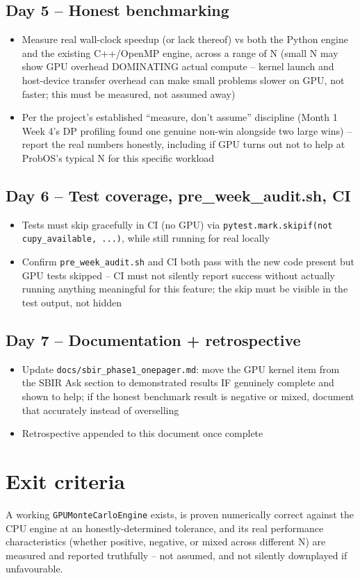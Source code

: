 \documentclass[11pt]{article}
\begin{document}
\subsection*{Day 5 -- Honest benchmarking}
\begin{itemize}[leftmargin=*]
  \item Measure real wall-clock speedup (or lack thereof) vs both the
    Python engine and the existing C++/OpenMP engine, across a range
    of N (small N may show GPU overhead DOMINATING actual compute --
    kernel launch and host-device transfer overhead can make small
    problems slower on GPU, not faster; this must be measured, not
    assumed away)
  \item Per the project's established ``measure, don't assume''
    discipline (Month 1 Week 4's DP profiling found one genuine
    non-win alongside two large wins) -- report the real numbers
    honestly, including if GPU turns out not to help at ProbOS's
    typical N for this specific workload
\end{itemize}

\subsection*{Day 6 -- Test coverage, pre\_week\_audit.sh, CI}
\begin{itemize}[leftmargin=*]
  \item Tests must skip gracefully in CI (no GPU) via
    \texttt{pytest.mark.skipif(not cupy\_available, ...)}, while still
    running for real locally
  \item Confirm \texttt{pre\_week\_audit.sh} and CI both pass with the
    new code present but GPU tests skipped -- CI must not silently
    report success without actually running anything meaningful for
    this feature; the skip must be visible in the test output, not
    hidden
\end{itemize}

\subsection*{Day 7 -- Documentation + retrospective}
\begin{itemize}[leftmargin=*]
  \item Update \texttt{docs/sbir\_phase1\_onepager.md}: move the GPU
    kernel item from the SBIR Ask section to demonstrated results IF
    genuinely complete and shown to help; if the honest benchmark
    result is negative or mixed, document that accurately instead of
    overselling
  \item Retrospective appended to this document once complete
\end{itemize}

\section*{Exit criteria}
A working \texttt{GPUMonteCarloEngine} exists, is proven numerically
correct against the CPU engine at an honestly-determined tolerance,
and its real performance characteristics (whether positive, negative,
or mixed across different N) are measured and reported truthfully --
not assumed, and not silently downplayed if unfavourable.
\end{document}

